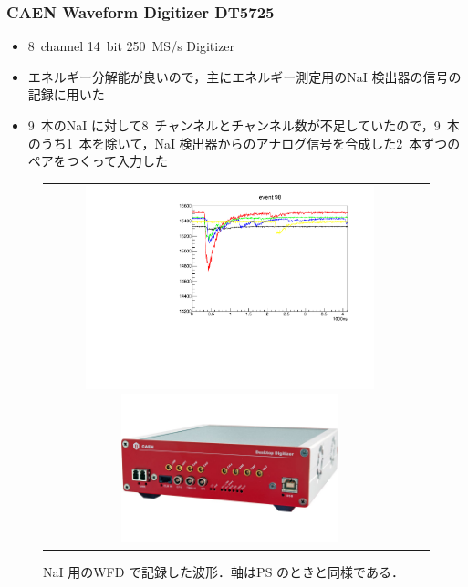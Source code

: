 \subsubsection{CAEN Waveform Digitizer DT5725}
\begin{itemize}
\item 8~channel 14~bit 250~MS/s Digitizer
\item エネルギー分解能が良いので，主にエネルギー測定用のNaI 検出器の信号の記録に用いた
\item 9~本のNaI に対して8~チャンネルとチャンネル数が不足していたので，9~本のうち1~本を除いて，NaI 検出器からのアナログ信号を合成した2~本ずつのペアをつくって入力した
\end{itemize}
\begin{figure}[H]
\begin{tabular}{cc}
\begin{minipage}{0.5\hsize}
\centering
\includegraphics[width=0.8\textwidth]{figure/hayakawa/NaI_plot.pdf}
\caption{NaI 用のWFD で記録した波形．軸はPS のときと同様である．}
\end{minipage}
\begin{minipage}{0.4\hsize}
\centering
\includegraphics[width=0.6\textwidth]{figure/hayakawa/DT5725_L.png}
\end{minipage}
\end{tabular}
\end{figure}


%
